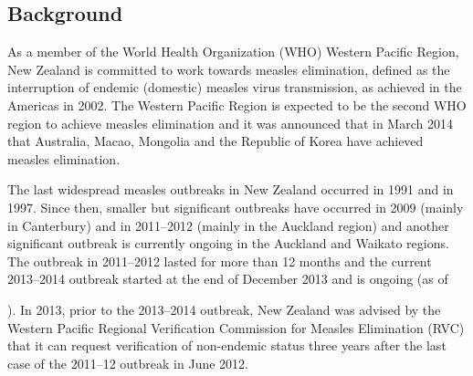 \documentclass{article}
\begin{document}
\begin{itemize}
\section{Background}

As a member of the World Health Organization (WHO) Western Pacific Region, New Zealand is committed to work towards measles elimination, defined as the interruption of endemic (domestic) measles virus transmission, as achieved in the Americas in 2002. The Western Pacific Region is expected to be the second WHO region to  achieve measles elimination and it was announced that in March 2014 that Australia, Macao, Mongolia and the Republic of Korea have achieved measles elimination.

The last widespread measles outbreaks in New Zealand occurred in 1991 and in 1997. Since then, smaller but significant outbreaks have occurred in 2009 (mainly in Canterbury) and in 2011--2012 (mainly in the Auckland region) and another significant outbreak is currently ongoing in the Auckland and Waikato regions. The outbreak in 2011--2012 lasted for more than 12 months and the current 2013--2014 outbreak started at the end of December 2013 and is ongoing (as of \date{3 July 2014}). In 2013, prior to the 2013--2014 outbreak, New Zealand was advised by the Western Pacific Regional Verification Commission for Measles Elimination (RVC) that it can request verification of non-endemic status three years after the last case of the 2011--12 outbreak in June 2012.


\end{itemize}
\end{document}
